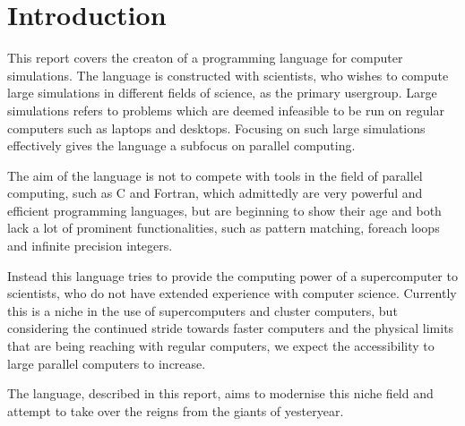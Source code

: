 \chapter{Introduction}\label{part:introduction}

This report covers the creaton of a programming language for computer simulations. The language is constructed with scientists, who wishes to compute large simulations in different fields of science, as the primary usergroup. Large simulations refers to problems which are deemed infeasible to be run on regular computers such as laptops and desktops. Focusing on such large simulations effectively gives the language a subfocus on parallel computing.

The aim of the language is not to compete with tools in the field of parallel computing, such as C and Fortran, which admittedly are very powerful and efficient programming languages, but are beginning to show their age and both lack a lot of prominent functionalities, such as pattern matching, foreach loops and infinite precision integers. 

Instead this language tries to provide the computing power of a supercomputer to scientists, who do not have extended experience with computer science. Currently this is a niche in the use of supercomputers and cluster computers, but considering the continued stride towards faster computers and the physical limits that are being reaching with regular computers, we expect the accessibility to large parallel computers to increase. 

The language, described in this report, aims to modernise this niche field and attempt to take over the reigns from the giants of yesteryear.